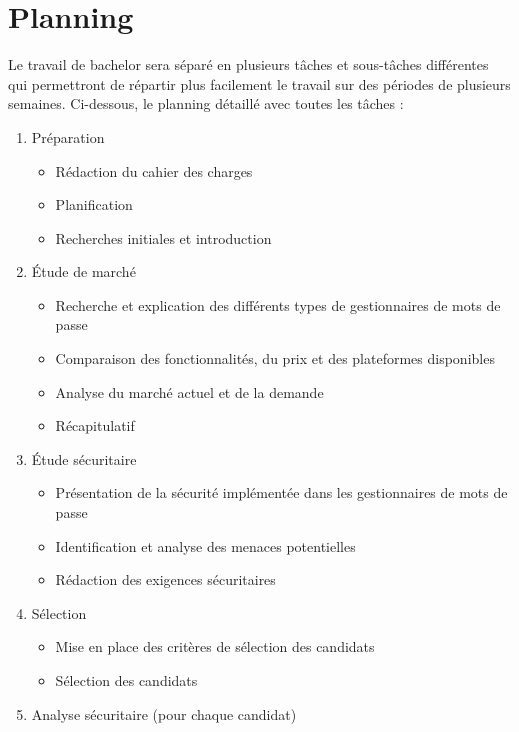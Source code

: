 

\chapter{Planning}
Le travail de bachelor sera séparé en plusieurs tâches et sous-tâches différentes qui permettront de répartir plus facilement le travail sur des périodes de plusieurs semaines. Ci-dessous, le planning détaillé avec toutes les tâches : 

\begin{enumerate}
	\item Préparation
	\begin{itemize}
		\item Rédaction du cahier des charges
		\item Planification
		\item Recherches initiales et introduction
	\end{itemize}
	\item Étude de marché
		\begin{itemize}
			\item Recherche et explication des différents types de gestionnaires de mots de passe
			\item Comparaison des fonctionnalités, du prix et des plateformes disponibles
			\item Analyse du marché actuel et de la demande
			\item Récapitulatif 
		\end{itemize}
	\item Étude sécuritaire
		\begin{itemize}
			\item Présentation de la sécurité implémentée dans les gestionnaires de mots de passe
			\item Identification et analyse des menaces potentielles
			\item Rédaction des exigences sécuritaires
		\end{itemize}
	\item Sélection
		\begin{itemize}
			\item Mise en place des critères de sélection des candidats
			\item Sélection des candidats
		\end{itemize}
	\item Analyse sécuritaire (pour chaque candidat)

\end{enumerate}
